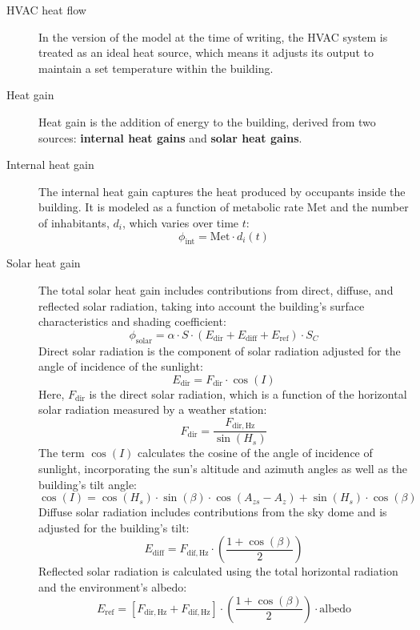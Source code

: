 \documentclass[runningheads]{llncs}
\begin{document}
\begin{description}
  \item[HVAC heat flow] In the version of the model at the time of writing, the HVAC system is treated as an ideal heat source, which means it adjusts its output to maintain a set temperature within the building.
  \item[Heat gain] Heat gain is the addition of energy to the building, derived from two sources: \textbf{internal heat gains} and \textbf{solar heat gains}.
  \item[Internal heat gain] The internal heat gain captures the heat produced by occupants inside the building. 
  It is modeled as a function of metabolic rate $\mathrm{Met}$ and the number of inhabitants, $d_i$, which varies over time $t$:
  \begin{equation}
    \phi_{\mathrm{int}} = \mathrm{Met} \cdot d_i(t)
  \end{equation}

\item[Solar heat gain] The total solar heat gain includes contributions from direct, diffuse, and reflected solar radiation, taking into account the building’s surface characteristics and shading coefficient:
\begin{equation}
  \phi_{\mathrm{solar}} = \alpha \cdot S \cdot \left( E_{\mathrm{dir}} + E_{\mathrm{diff}} + E_{\mathrm{ref}} \right) \cdot S_C
\end{equation}
Direct solar radiation is the component of solar radiation adjusted for the angle of incidence of the sunlight:
\begin{equation}
  E_{\mathrm{dir}} = F_{\mathrm{dir}} \cdot \cos(I)
\end{equation}
Here, $F_{\mathrm{dir}}$ is the direct solar radiation, which is a function of the horizontal solar radiation measured by a weather station:
\begin{equation}
  F_{\mathrm{dir}} = \dfrac{F_{\mathrm{dir,Hz}}}{\sin(H_s)}
\end{equation}
The term $\cos(I)$ calculates the cosine of the angle of incidence of sunlight, incorporating the sun's altitude and azimuth angles as well as the building's tilt angle:
\begin{equation}
  \cos(I) = \cos(H_s) \cdot \sin(\beta) \cdot \cos(A_{zs} - A_z) + \sin(H_s) \cdot \cos(\beta)
\end{equation}
Diffuse solar radiation includes contributions from the sky dome and is adjusted for the building's tilt:
\begin{equation}
  E_{\mathrm{diff}} = F_{\mathrm{dif,Hz}} \cdot \left( \dfrac{1 + \cos(\beta)}{2} \right)
\end{equation}
Reflected solar radiation is calculated using the total horizontal radiation and the environment's albedo:
\begin{equation}
  E_{\mathrm{ref}} = \left[ F_{\mathrm{dir,Hz}} + F_{\mathrm{dif,Hz}} \right] \cdot \left( \dfrac{1 + \cos(\beta)}{2} \right) \cdot \text{albedo}
\end{equation}


\end{description}
\end{document}
